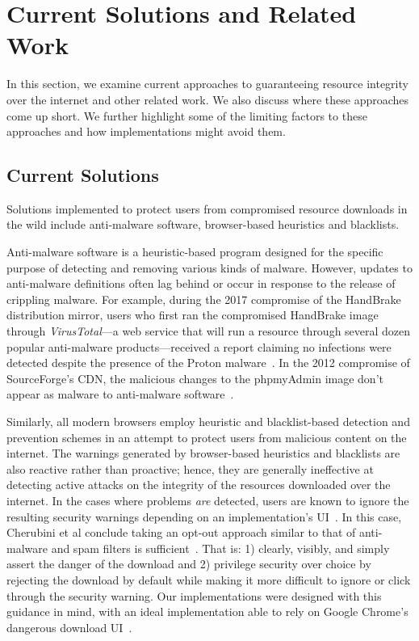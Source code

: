 \section{Current Solutions and Related Work} \label{sec:related}

In this section, we examine current approaches to guaranteeing resource
integrity over the internet and other related work. We also discuss where these
approaches come up short. We further highlight some of the limiting factors to
these approaches and how \SYSTEM{} implementations might avoid them.

\subsection{Current Solutions}

Solutions implemented to protect users from compromised resource downloads in
the wild include anti-malware software, browser-based heuristics and blacklists.

Anti-malware software is a heuristic-based program designed for the specific
purpose of detecting and removing various kinds of malware. However, updates to
anti-malware definitions often lag behind or occur in response to the release of
crippling malware. For example, during the 2017 compromise of the HandBrake
distribution mirror, users who first ran the compromised HandBrake image through
\textit{VirusTotal}---a web service that will run a resource through several
dozen popular anti-malware products---received a report claiming no infections
were detected despite the presence of the Proton malware~\cite{SCA-HB1}. In the
2012 compromise of SourceForge's CDN, the malicious changes to the phpmyAdmin
image don't appear as malware to anti-malware software~\cite{SCA-PMA1}.

Similarly, all modern browsers employ heuristic and blacklist-based detection
and prevention schemes in an attempt to protect users from malicious content on
the internet. The warnings generated by browser-based heuristics and blacklists
are also reactive rather than proactive; hence, they are generally
ineffective at detecting active attacks on the integrity of the resources
downloaded over the internet. In the cases where problems \emph{are} detected,
users are known to ignore the resulting security warnings depending on an
implementation's UI~\cite{Clickthrough, Modic, Akhawe, ChromeClickThrough}. In
this case, Cherubini et al conclude taking an opt-out approach similar to that
of anti-malware and spam filters is sufficient~\cite{Cherubini}. That is: 1)
clearly, visibly, and simply assert the danger of the download and 2) privilege
security over choice by rejecting the download by default while making it more
difficult to ignore or click through the security warning. Our \SYSTEM{}
implementations were designed with this guidance in mind, with an ideal
implementation able to rely on Google Chrome's dangerous download
UI~\cite{ChromeClickThrough}.

